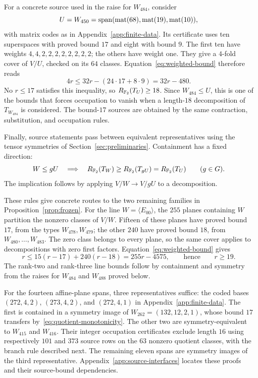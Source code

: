 For a concrete source used in the raise for $W_{484}$, consider
\[
 U=W_{450}=\operatorname{span}(\operatorname{mat}(68),\operatorname{mat}(19),
 \operatorname{mat}(10)),
\]
with matrix codes as in
Appendix~\ref{app:finite-data}. Its certificate uses ten superspaces
with proved bound $17$ and eight with bound $9$. The first ten have
weights $4,4,2,2,2,2,2,2,2,2$; the others have weight one.
They give a $4$-fold cover of $V/U$, checked on its $64$ classes.
Equation~\eqref{eq:weighted-bound} therefore reads
\[
 4r\leq32r-(24\cdot17+8\cdot9)=32r-480.
\]
No $r\leq17$ satisfies this inequality, so $R_{\mathbb F_2}(T_U)\geq18$.
Since $W_{484}\leq U$, this is one of the bounds that forces
occupation to vanish when a length-$18$ decomposition of
$T_{W_{484}}$ is considered. The bound-$17$ sources are obtained by
the same contraction, substitution, and occupation rules.

Finally, source statements pass between equivalent representatives
using the tensor symmetries of Section~\ref{sec:preliminaries}.
Containment has a fixed direction:
\begin{equation}\label{eq:quotient-monotonicity}
 W\leq gU\quad\Longrightarrow\quad
 R_{\mathbb F_2}(T_W)\geq R_{\mathbb F_2}(T_{gU})=R_{\mathbb F_2}(T_U)
 \qquad(g\in G).
\end{equation}
The implication follows by applying $V/W\to V/gU$ to a
decomposition.

These rules give concrete routes to the two remaining families in
Proposition~\ref{prop:frozen}. For the line $W=\langle E_{00}\rangle$,
the $255$ planes containing $W$ partition the nonzero classes of $V/W$.
Fifteen of these planes have proved bound $17$, from the types
$W_{478},W_{479}$; the other $240$ have proved bound $18$, from
$W_{480},\ldots,W_{483}$. The zero class belongs to every plane, so
the same cover applies to decompositions with zero first factors.
Equation~\eqref{eq:weighted-bound} gives
\begin{equation}\label{eq:line-cover}
 r\leq15(r-17)+240(r-18)=255r-4575,
 \qquad\text{hence}\qquad r\geq19.
\end{equation}
The rank-two and rank-three line bounds follow by containment and
symmetry from the raises for $W_{484}$ and $W_{488}$ proved below.

For the fourteen affine-plane spans, three representatives suffice:
the coded bases $(272,4,2)$, $(273,4,2)$, and $(272,4,1)$ in
Appendix~\ref{app:finite-data}. The first is contained in a symmetry
image of $W_{262}=(132,12,2,1)$, whose bound $17$ transfers
by~\eqref{eq:quotient-monotonicity}. The other two are symmetry-equivalent
to $W_{415}$ and $W_{416}$. Their integer occupation certificates exclude length $16$
using respectively $101$ and $373$ source rows on the $63$ nonzero
quotient classes, with the branch rule described next. The remaining
eleven spans are symmetry images of the third representative.
Appendix~\ref{app:source-interfaces} locates these proofs and their
source-bound dependencies.

